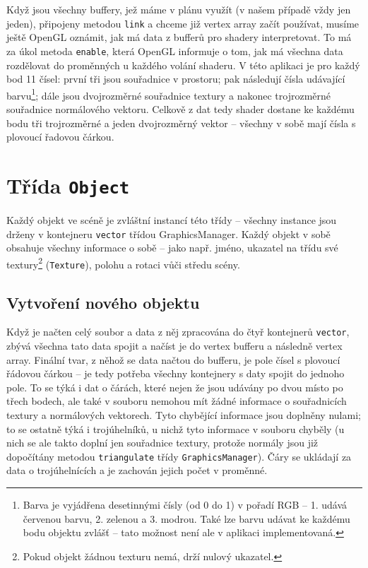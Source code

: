 \documentclass[a4paper, 11pt]{report}
\begin{document}
Když jsou všechny buffery, jež máme v plánu využít (v našem případě vždy jen jeden), připojeny metodou \texttt{link} a chceme již vertex array začít používat, musíme ještě OpenGL oznámit, jak má data z bufferů pro shadery interpretovat. To má za úkol metoda \texttt{enable}, která OpenGL informuje o tom, jak má všechna data rozdělovat do proměnných u každého volání shaderu. V této aplikaci je pro každý bod 11 čísel: první tři jsou souřadnice v prostoru; pak následují čísla udávající barvu\footnote{Barva je vyjádřena desetinnými čísly (od 0 do 1) v pořadí RGB -- 1. udává červenou barvu, 2. zelenou a 3. modrou. Také lze barvu udávat ke každému bodu objektu zvlášť -- tato možnost není ale v aplikaci implementovaná.}; dále jsou dvojrozměrné souřadnice textury a nakonec trojrozměrné souřadnice normálového vektoru. Celkově z dat tedy shader dostane ke každému bodu tři trojrozměrné a jeden dvojrozměrný vektor -- všechny v sobě mají čísla s plovoucí řadovou čárkou.

\section{\label{objekt}Třída \texttt{Object}}
Každý objekt ve scéně je zvláštní instancí této třídy -- všechny instance jsou drženy v kontejneru \texttt{vector} třídou GraphicsManager. Každý objekt v sobě obsahuje všechny informace o sobě -- jako např. jméno, ukazatel na třídu své textury\footnote{Pokud objekt žádnou texturu nemá, drží nulový ukazatel.} (\texttt{Texture}), polohu a rotaci vůči středu scény.

\subsection{Vytvoření nového objektu}
Když je načten celý soubor a data z něj zpracována do čtyř kontejnerů \texttt{vector}, zbývá všechna tato data spojit a načíst je do vertex bufferu a následně vertex array. Finální tvar, z něhož se data načtou do bufferu, je pole čísel s plovoucí řádovou čárkou -- je tedy potřeba všechny kontejnery s daty spojit do jednoho pole. To se týká i dat o čárách, které nejen že jsou udávány po dvou místo po třech bodech, ale také v souboru nemohou mít žádné informace o souřadnicích textury a normálových vektorech. Tyto chybějící informace jsou doplněny nulami; to se ostatně týká i trojúhelníků, u nichž tyto informace v souboru chyběly (u nich se ale takto doplní jen souřadnice textury, protože normály jsou již dopočítány metodou \texttt{triangulate} třídy \texttt{GraphicsManager}). Čáry se ukládají za data o trojúhelnících a je zachován jejich počet v proměnné.
\end{document}
